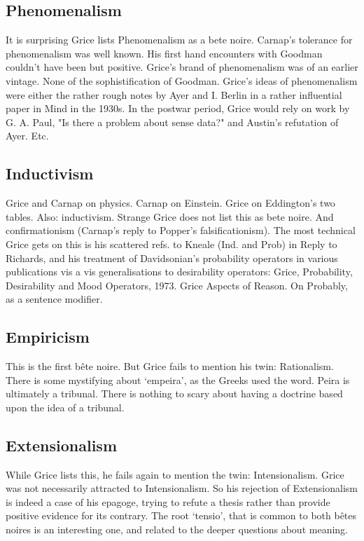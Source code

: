 \documentclass[10pt,titlepage]{book}
\begin{document}
\subsection{Phenomenalism}

It is surprising Grice lists Phenomenalism as a bete 
noire. Carnap's tolerance  for phenomenalism was well known. His first hand 
encounters with Goodman  couldn't have been but positive. Grice's brand of 
phenomenalism was of an  earlier vintage. None of the sophistification of 
Goodman. Grice's ideas of  phenomenalism were either the rather rough notes by Ayer 
and I. Berlin in a  rather influential paper in Mind in the 1930s. In the 
postwar period, Grice  would rely on work by G. A. Paul, "Is there a problem 
about sense data?" and  Austin's refutation of Ayer. Etc. 

\subsection{Inductivism}

Grice and Carnap on physics. Carnap on Einstein. Grice on 
Eddington's two  tables. Also: 
inductivism.  Strange Grice does not list this as bete noire. And 
confirmationism (Carnap's  reply to Popper's falsificationism). The most technical 
Grice gets on this is  his scattered refs. to Kneale (Ind. and Prob) in Reply 
to Richards, and his  treatment of Davidsonian's probability operators in 
various publications vis a  vis generalisations to desirability operators:  
Grice, Probability, Desirability and Mood  Operators, 1973. Grice Aspects of 
Reason. On Probably, as a sentence modifier.

\subsection{Empiricism}

This is the first bête noire. But Grice fails to mention his 
twin: Rationalism.  There is some mystifying about ‘empeira’, as the Greeks 
used the word. Peira is  ultimately a tribunal. There is nothing to scary 
about having a doctrine based  upon the idea of a tribunal.  

\subsection{Extensionalism}

While Grice lists this, he fails again to mention the 
twin: Intensionalism.  Grice was not necessarily attracted to Intensionalism. So 
his rejection of  Extensionalism is indeed a case of his epagoge, trying to 
refute a thesis rather  than provide positive evidence for its contrary. 
The root ‘tensio’, that is  common to both bêtes noires is an interesting 
one, and related to the deeper  questions about meaning. 
\end{document}
